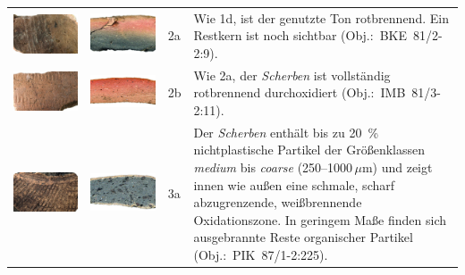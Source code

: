 \begin{footnotesize}
{\begin{longtable}{@{}m{}m{}m{}m{}@{}}
\includegraphics[width=.3\textwidth]{tbl/Tab_Fabrics/BKE81-2-2-9_5cm.jpg} & \includegraphics[width=.3\textwidth]{tbl/Tab_Fabrics/BKE81-2-2-9_2cm.jpg} & 2a & Wie 1d, ist der genutzte Ton rotbrennend. Ein Restkern ist noch sichtbar (Obj.:~BKE~81/2-2:9). \\
\includegraphics[width=.3\textwidth]{tbl/Tab_Fabrics/IMB81-3-2_11_5cm.jpg} & \includegraphics[width=.3\textwidth]{tbl/Tab_Fabrics/IMB81-3-2_11_2cm.jpg} & 2b & Wie 2a, der \textit{Scherben} ist vollständig rotbrennend durchoxidiert (Obj.:~IMB~81/3-2:11). \\
\includegraphics[width=.3\textwidth]{tbl/Tab_Fabrics/PIK87-1-2-225_5cm.jpg} & \includegraphics[width=.3\textwidth]{tbl/Tab_Fabrics/PIK87-1-2-225_2cm.jpg} & 3a & Der \textit{Scherben} enthält bis zu 20~\% nichtplastische Partikel der Größenklassen \textit{medium} bis \textit{coarse} (250--1000\,$\mu$m) und zeigt innen wie außen eine schmale, scharf abzugrenzende, weißbrennende Oxidationszone. In geringem Maße finden sich ausgebrannte Reste organischer Partikel (Obj.:~PIK~87/1-2:225). \\

\end{longtable}}
\end{footnotesize}
